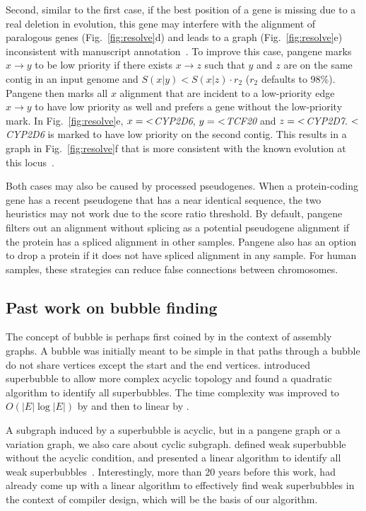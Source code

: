 \documentclass[webpdf,contemporary,large,namedate]{oup-authoring-template}%
\begin{document}
Second, similar to the first case, if the best position of a gene is missing due to a real deletion in evolution,
this gene may interfere with the alignment of paralogous genes (Fig.~\ref{fig:resolve}d)
and leads to a graph (Fig.~\ref{fig:resolve}e) inconsistent with manuscript annotation~\citep{Liao:2023aa}.
To improve this case, pangene marks $x\to y$ to be low priority
if there exists $x\to z$ such that $y$ and $z$ are on the same contig in an input genome and $S(x|y)<S(x|z)\cdot r_2$ ($r_2$ defaults to 98\%).
Pangene then marks all $x$ alignment that are incident to a low-priority edge $x\to y$ to have low priority as well
and prefers a gene without the low-priority mark.
In Fig.~\ref{fig:resolve}e, $x={\rm <}$\emph{CYP2D6}, $y={\rm <}$\emph{TCF20} and $z={\rm <}$\emph{CYP2D7}.
${\rm <}$\emph{CYP2D6} is marked to have low priority on the second contig.
This results in a graph in Fig.~\ref{fig:resolve}f that is more consistent with the known evolution at this locus~\citep{Liao:2023aa}.

Both cases may also be caused by processed pseudogenes.
When a protein-coding gene has a recent pseudogene that has a near identical sequence,
the two heuristics may not work due to the score ratio threshold.
By default, pangene filters out an alignment without splicing as a potential pseudogene alignment if the protein has a spliced alignment in other samples.
Pangene also has an option to drop a protein if it does not have spliced alignment in any sample.
For human samples, these strategies can reduce false connections between chromosomes.

\subsection{Past work on bubble finding}

The concept of bubble is perhaps first coined by \citet{Zerbino:2008uq} in the context of assembly graphs.
A bubble was initially meant to be simple in that paths through a bubble do not share vertices except the start and the end vertices.
\citet{DBLP:conf/wabi/OnoderaSS13} introduced superbubble to allow more complex acyclic topology
and found a quadratic algorithm to identify all superbubbles.
The time complexity was improved to $O(|E|\log|E|)$ by \citet{Sung:2015aa}
and then to linear by \citet{DBLP:journals/tcs/BrankovicIKMPV16}.

A subgraph induced by a superbubble is acyclic, but in a pangene graph or a variation graph,
we also care about cyclic subgraph.
\citet{Gartner:2018aa} defined weak superbubble without the acyclic condition,
and presented a linear algorithm to identify all weak superbubbles~\citep{DBLP:journals/algorithms/GartnerS19}.
Interestingly, more than 20 years before this work,
\citet{DBLP:conf/pldi/JohnsonPP94} had already come up with a linear algorithm to effectively find weak superbubbles in the context of compiler design,
which will be the basis of our algorithm.
\end{document}
